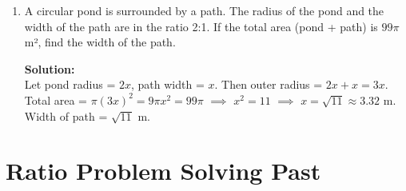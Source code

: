 \documentclass[12pt,a4paper]{article}
\begin{document}
\begin{enumerate}
\item A circular pond is surrounded by a path. The radius of the pond and the width of the path are in the ratio 2:1. If the total area (pond + path) is \( 99\pi \) m², find the width of the path.

\textbf{Solution:}\\
Let pond radius = \( 2x \), path width = \( x \). Then outer radius = \( 2x + x = 3x \).\\
Total area = \( \pi (3x)^2 = 9\pi x^2 = 99\pi \) \( \implies \) \( x^2 = 11 \) \( \implies \) \( x = \sqrt{11} \approx 3.32 \) m.\\
Width of path = \( \sqrt{11} \) m.

\end{enumerate}

\section*{Ratio Problem Solving Past}
\end{document}
